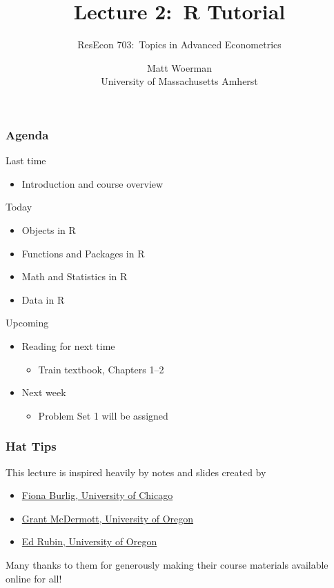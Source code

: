 \documentclass{beamer}
\title[Lecture 2:\ R Tutorial]{Lecture 2:\ R Tutorial}
\author[ResEcon 703:\ Advanced Econometrics]{ResEcon 703:\ Topics in Advanced Econometrics}
\date{Matt Woerman\\University of Massachusetts Amherst}
\begin{document}
{ 
\begin{frame}[noframenumbering]
    \titlepage
\end{frame}
}

\begin{frame}\frametitle{Agenda}
    Last time
    \begin{itemize}
        \item Introduction and course overview
    \end{itemize}
    \vspace{2ex}
    Today
    \begin{itemize}
        \item Objects in R
        \item Functions and Packages in R
        \item Math and Statistics in R
        \item Data in R
    \end{itemize}
    \vspace{2ex}
    Upcoming
    \begin{itemize}
        \item Reading for next time
        \begin{itemize}
            \item Train textbook, Chapters 1--2
        \end{itemize}
        \item Next week
        \begin{itemize}
            \item Problem Set 1 will be assigned
        \end{itemize}
    \end{itemize}
\end{frame}

\begin{frame}\frametitle{Hat Tips}
    This lecture is inspired heavily by notes and slides created by
    \begin{itemize}
        \item \href{https://www.fionaburlig.com/}{Fiona Burlig, University of Chicago}
        \item \href{https://grantmcdermott.com/}{Grant McDermott, University of Oregon}
        \item \href{http://edrub.in/}{Ed Rubin, University of Oregon}
    \end{itemize}
    \vspace{3ex}
    Many thanks to them for generously making their course materials available online for all!
\end{frame}
\end{document}
